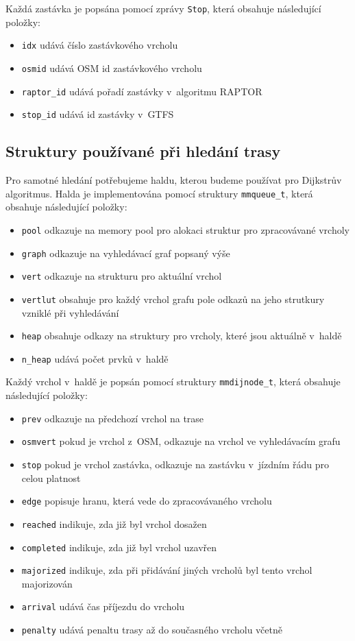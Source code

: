 Každá zastávka je popsána pomocí zprávy {\tt Stop}, která obsahuje následující
položky:
\begin{itemize}
	\item {\tt idx} udává číslo zastávkového vrcholu
	\item {\tt osmid} udává OSM id zastávkového vrcholu 
	\item {\tt raptor\_id} udává pořadí zastávky v~algoritmu RAPTOR
	\item {\tt stop\_id} udává id zastávky v~GTFS
\end{itemize} 

\subsection{Struktury používané při hledání trasy}
Pro samotné hledání potřebujeme haldu, kterou budeme používat pro Dijkstrův
algoritmus. Halda je implementována pomocí struktury {\tt mmqueue\_t}, která
obsahuje následující položky:
\begin{itemize}
	\item {\tt pool} odkazuje na memory pool pro alokaci struktur pro
		zpracovávané vrcholy 
	\item {\tt graph} odkazuje na vyhledávací graf popsaný výše
	\item {\tt vert} odkazuje na strukturu pro aktuální vrchol 
	\item {\tt vertlut} obsahuje pro každý vrchol grafu pole odkazů na
	jeho strutkury vzniklé při vyhledávání
	\item {\tt heap} obsahuje odkazy na struktury pro vrcholy, které jsou
		aktuálně v~haldě
	\item {\tt n\_heap} udává počet prvků v~haldě
\end{itemize}
Každý vrchol v~haldě je popsán pomocí struktury {\tt mmdijnode\_t}, která
obsahuje následující položky:
\begin{itemize}
	\item {\tt prev} odkazuje na předchozí vrchol na trase
	\item {\tt osmvert} pokud je vrchol z~OSM, odkazuje na vrchol ve
	vyhledávacím grafu 
	\item {\tt stop} pokud je vrchol zastávka, odkazuje na zastávku
v~jízdním řádu pro celou platnost
	\item {\tt edge} popisuje hranu, která vede do zpracovávaného vrcholu 
	\item {\tt reached} indikuje, zda již byl vrchol dosažen
	\item {\tt completed} indikuje, zda již byl vrchol uzavřen
	\item {\tt majorized} indikuje, zda při přidávání jiných vrcholů byl
	tento vrchol majorizován
	\item {\tt arrival} udává čas příjezdu do vrcholu
	\item {\tt penalty} udává penaltu trasy až do současného vrcholu včetně
\end{itemize}
